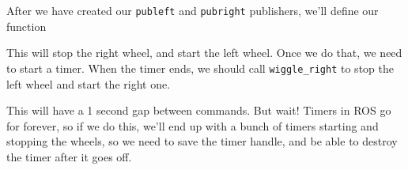 After we have created our \texttt{publeft} and \texttt{pubright}
publishers, we'll define our function

\begin{Shaded}
\begin{Highlighting}[]
\OperatorTok{=}

\OperatorTok{=} 

\OperatorTok{=} 
\end{Highlighting}
\end{Shaded}

This will stop the right wheel, and start the left wheel. Once we do
that, we need to start a timer. When the timer ends, we should call
\texttt{wiggle\_right} to stop the left wheel and start the right one.

\begin{Shaded}
\begin{Highlighting}[]
\OperatorTok{=}

\OperatorTok{=} 

\OperatorTok{=} 

\end{Highlighting}
\end{Shaded}

This will have a 1 second gap between commands. But wait! Timers in ROS
go for forever, so if we do this, we'll end up with a bunch of timers
starting and stopping the wheels, so we need to save the timer handle,
and be able to destroy the timer after it goes off.

\begin{Shaded}
\begin{Highlighting}[]

\OperatorTok{=}

\OperatorTok{=} 

\OperatorTok{=} 

\OperatorTok{=}
\end{Highlighting}
\end{Shaded}


